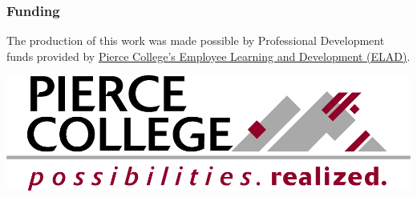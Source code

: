 \subsubsection{Funding}

The production of this work was made possible by Professional Development funds provided by \href{https://www.pierce.ctc.edu/elad}{Pierce College's Employee Learning and Development (ELAD)}. 


\includegraphics{marcom-PierceCollege-Logo.png}
\bigskip

